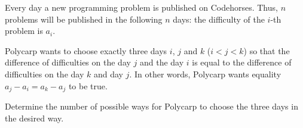 Every day a new programming problem is published on Codehorses. Thus, $n$ problems will be published in the following $n$ days: the difficulty of the $i$-th problem is $a_i$.

Polycarp wants to choose exactly three days $i$, $j$ and $k$ ($i < j < k$) so that the difference of difficulties on the day $j$ and the day $i$ is equal to the difference of difficulties on the day $k$ and day $j$.
In other words, Polycarp wants equality $a_j-a_i=a_k-a_j$ to be true.

Determine the number of possible ways for Polycarp to choose the three days in the desired way.